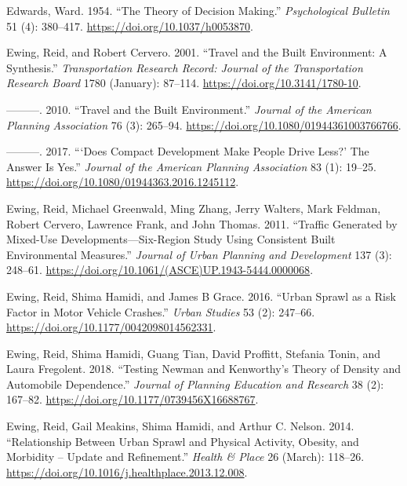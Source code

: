 \documentclass[
  12pt,
]{article}
\newlength{\cslhangindent}
\newlength{\cslentryspacingunit} %
\newenvironment{CSLReferences}[2] %
 {%
  \setlength{\parindent}{0pt}
  \ifodd #1
  \let\oldpar\par
  \def\par{\hangindent=\cslhangindent\oldpar}
  \fi
  \setlength{\parskip}{#2\cslentryspacingunit}
 }%
 {}
\begin{document}
\begin{CSLReferences}{1}{0}
\leavevmode{}%
Edwards, Ward. 1954. {``The Theory of Decision Making.''} \emph{Psychological Bulletin} 51 (4): 380--417. \url{https://doi.org/10.1037/h0053870}.

\leavevmode{}%
Ewing, Reid, and Robert Cervero. 2001. {``Travel and the {Built Environment}: {A Synthesis}.''} \emph{Transportation Research Record: Journal of the Transportation Research Board} 1780 (January): 87--114. \url{https://doi.org/10.3141/1780-10}.

\leavevmode{}%
---------. 2010. {``Travel and the {Built Environment}.''} \emph{Journal of the American Planning Association} 76 (3): 265--94. \url{https://doi.org/10.1080/01944361003766766}.

\leavevmode{}%
---------. 2017. {``{`{Does Compact Development Make People Drive Less}?'} {The Answer Is Yes}.''} \emph{Journal of the American Planning Association} 83 (1): 19--25. \url{https://doi.org/10.1080/01944363.2016.1245112}.

\leavevmode{}%
Ewing, Reid, Michael Greenwald, Ming Zhang, Jerry Walters, Mark Feldman, Robert Cervero, Lawrence Frank, and John Thomas. 2011. {``Traffic {Generated} by {Mixed-Use Developments}---{Six-Region Study Using Consistent Built Environmental Measures}.''} \emph{Journal of Urban Planning and Development} 137 (3): 248--61. \url{https://doi.org/10.1061/(ASCE)UP.1943-5444.0000068}.

\leavevmode{}%
Ewing, Reid, Shima Hamidi, and James B Grace. 2016. {``Urban Sprawl as a Risk Factor in Motor Vehicle Crashes.''} \emph{Urban Studies} 53 (2): 247--66. \url{https://doi.org/10.1177/0042098014562331}.

\leavevmode{}%
Ewing, Reid, Shima Hamidi, Guang Tian, David Proffitt, Stefania Tonin, and Laura Fregolent. 2018. {``Testing {Newman} and {Kenworthy}'s {Theory} of {Density} and {Automobile Dependence}.''} \emph{Journal of Planning Education and Research} 38 (2): 167--82. \url{https://doi.org/10.1177/0739456X16688767}.

\leavevmode{}%
Ewing, Reid, Gail Meakins, Shima Hamidi, and Arthur C. Nelson. 2014. {``Relationship Between Urban Sprawl and Physical Activity, Obesity, and Morbidity -- {Update} and Refinement.''} \emph{Health \& Place} 26 (March): 118--26. \url{https://doi.org/10.1016/j.healthplace.2013.12.008}.


\end{CSLReferences}
\end{document}
